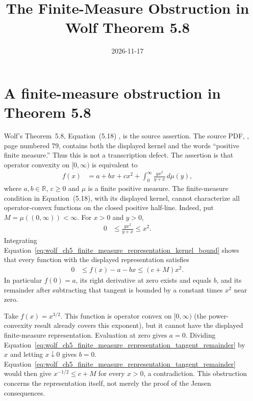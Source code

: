\documentclass{article}
\title{The Finite-Measure Obstruction in Wolf Theorem 5.8}
\author{}
\date{2026-11-17}
\begin{document}
\maketitle
{}

\section{A finite-measure obstruction in Theorem 5.8}

Wolf's Theorem~5.8, Equation~(5.18) \cite{Wolf2012Quantum}, is the source assertion.
The source PDF, ,
page numbered 79, contains both the displayed kernel and the words
``positive finite measure.'' Thus this is not a transcription defect.
The assertion is that operator convexity on $[0,\infty)$ is equivalent to
\begin{align}
 f(x)&=a+bx+cx^2+\int_0^\infty\frac{yx^2}{y+x}\,d\mu(y),
 \label{eq:wolf_ch5_finite_measure_representation_source}
\end{align}
where $a,b\in\mathbb R$, $c\geq0$ and $\mu$ is a finite positive measure.
The finite-measure condition in Equation~(5.18), with its displayed kernel,
cannot characterize all operator-convex functions on the closed positive
half-line. Indeed, put $M=\mu((0,\infty))<\infty$. For $x>0$ and $y>0$,
\begin{align}
  0&\leq \frac{yx^2}{y+x}\leq x^2.
  \label{eq:wolf_ch5_finite_measure_representation_kernel_bound}
\end{align}
Integrating Equation~\ref{eq:wolf_ch5_finite_measure_representation_kernel_bound}
shows that every function with the displayed representation satisfies
\begin{align}
  0&\leq f(x)-a-bx\leq (c+M)x^2.
  \label{eq:wolf_ch5_finite_measure_representation_tangent_remainder}
\end{align}
In particular $f(0)=a$, its right derivative at zero exists and equals $b$,
and its remainder after subtracting that tangent is bounded by a constant
times $x^2$ near zero.

Take $f(x)=x^{3/2}$. This function is operator convex on $[0,\infty)$
(the power-convexity result already covers this exponent), but it cannot
have the displayed finite-measure representation. Evaluation at zero gives
$a=0$. Dividing Equation~\ref{eq:wolf_ch5_finite_measure_representation_tangent_remainder} by $x$ and letting $x\downarrow0$ gives $b=0$.
Equation~\ref{eq:wolf_ch5_finite_measure_representation_tangent_remainder} would then give $x^{-1/2}\leq c+M$ for every $x>0$, a
contradiction. This obstruction concerns the representation itself, not
merely the proof of the Jensen consequences.
\end{document}
